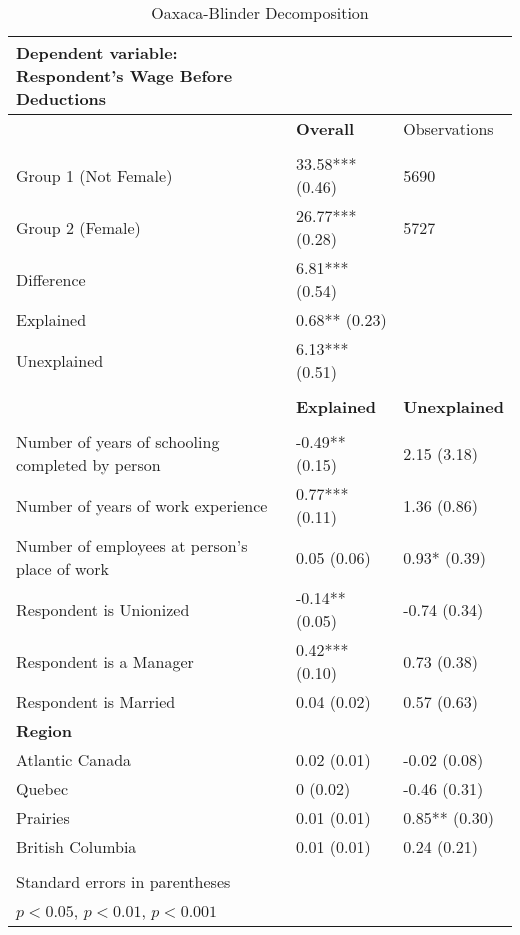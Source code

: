 \documentclass[11pt]{article}
\begin{document}
{\begin{table}[t]
  \centering
  \caption{Oaxaca-Blinder Decomposition}
    \begin{tabular}{lll}
\hline\hline
Dependent variable: Respondent's Wage Before Deductions &       &  \\
\hline
          & \multicolumn{1}{l}{\textbf{Overall}} & \multicolumn{1}{l}{Observations} \\
\\
    Group 1 (Not Female) & 33.58*** (0.46) & 5690 \\
    Group 2 (Female) & 26.77*** (0.28) & 5727 \\
    Difference & 6.81*** (0.54) &  \\
    Explained & 0.68** (0.23) &  \\
    Unexplained & 6.13*** (0.51) &  \\
    \\
\hline
          & \multicolumn{1}{l}{\textbf{Explained}} & \multicolumn{1}{l}{\textbf{Unexplained}} \\
\\
    Number of years of schooling completed by person & -0.49** (0.15) & 2.15 (3.18) \\
    Number of years of work experience & 0.77*** (0.11) & 1.36 (0.86) \\
    Number of employees at person's place of work  & 0.05 (0.06) & 0.93* (0.39) \\
    Respondent is Unionized & -0.14** (0.05) & -0.74 (0.34) \\
    Respondent is a Manager & 0.42*** (0.10) & 0.73 (0.38) \\
    Respondent is Married & 0.04 (0.02) & 0.57 (0.63) \\
\textbf{Region}            &                  &                 \\            
    \hspace{\parindent} \hspace{\parindent}Atlantic Canada & 0.02 (0.01) & -0.02 (0.08) \\
    \hspace{\parindent} \hspace{\parindent}Quebec & 0 (0.02) & -0.46 (0.31) \\
    \hspace{\parindent} \hspace{\parindent}Prairies & 0.01 (0.01) & 0.85** (0.30) \\
    \hspace{\parindent} \hspace{\parindent}British Columbia & 0.01 (0.01) & 0.24 (0.21) \\
    \\
    \hline\hline
\multicolumn{3}{l}{\footnotesize Standard errors in parentheses}\\
\multicolumn{3}{l}{\footnotesize \sym{*} \(p<0.05\), \sym{**} \(p<0.01\), \sym{***} \(p<0.001\)}\\
    \end{tabular}
\end{table}

}
\end{document}
